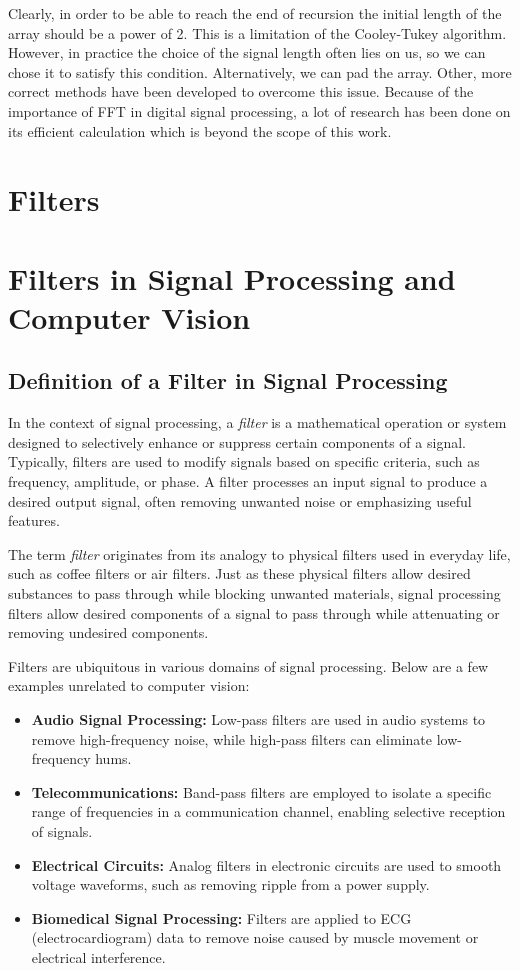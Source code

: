 \documentclass[11pt]{book}
\begin{document}
Clearly, in order to be able to reach the end of recursion the initial length of the array should be a power of 2. This is a limitation of the Cooley-Tukey algorithm. However, in practice the choice of the signal length often lies on us, so we can chose it to satisfy this condition. Alternatively, we can pad the array. Other, more correct methods have been developed to overcome this issue. Because of the importance of FFT in digital signal processing, a lot of research has been done on its efficient calculation which is beyond the scope of this work.

\section{Filters}

\section{Filters in Signal Processing and Computer Vision}

\subsection{Definition of a Filter in Signal Processing}
In the context of signal processing, a \emph{filter} is a mathematical operation or system designed to selectively enhance or suppress certain components of a signal. Typically, filters are used to modify signals based on specific criteria, such as frequency, amplitude, or phase. A filter processes an input signal to produce a desired output signal, often removing unwanted noise or emphasizing useful features.

The term \emph{filter} originates from its analogy to physical filters used in everyday life, such as coffee filters or air filters. Just as these physical filters allow desired substances to pass through while blocking unwanted materials, signal processing filters allow desired components of a signal to pass through while attenuating or removing undesired components.

Filters are ubiquitous in various domains of signal processing. Below are a few examples unrelated to computer vision:
\begin{itemize}
    \item \textbf{Audio Signal Processing:} Low-pass filters are used in audio systems to remove high-frequency noise, while high-pass filters can eliminate low-frequency hums.
    \item \textbf{Telecommunications:} Band-pass filters are employed to isolate a specific range of frequencies in a communication channel, enabling selective reception of signals.
    \item \textbf{Electrical Circuits:} Analog filters in electronic circuits are used to smooth voltage waveforms, such as removing ripple from a power supply.
    \item \textbf{Biomedical Signal Processing:} Filters are applied to ECG (electrocardiogram) data to remove noise caused by muscle movement or electrical interference.
\end{itemize}
\end{document}
